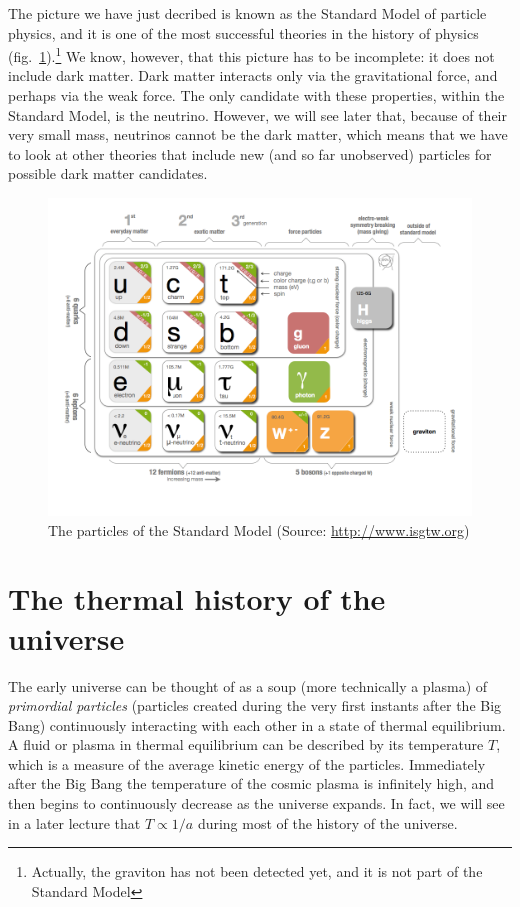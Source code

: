 The picture we have just decribed is known as the Standard Model of particle physics, and it is one of the most successful theories in the history of physics (fig.\ \ref{fig:lec6_5}).\footnote{Actually, the graviton has not been detected yet, and it is not part of the Standard Model} We know, however, that this picture has to be incomplete: it does not include dark matter. Dark matter interacts only via the gravitational force, and perhaps via the weak force. The only candidate with these properties, within the Standard Model, is the neutrino. However, we will see later that, because of their very small mass, neutrinos cannot be the dark matter, which means that we have to look at other theories that include new (and so far unobserved) particles for possible dark matter candidates.
\begin{figure}[ht]
\begin{center}
\includegraphics[scale=0.35]{Draw/lec6_5.png}
\end{center}
\caption{The particles of the Standard Model (Source: \url{http://www.isgtw.org})}
\label{fig:lec6_5}
\end{figure}

\section{The thermal history of the universe}
\label{chp7}

The early universe can be thought of as a soup (more technically a plasma) of {\it primordial particles} (particles created during the very first instants after the Big Bang) continuously interacting with each other in a state of thermal equilibrium. A fluid or plasma in thermal equilibrium can be described by its temperature $T$, which is a measure of the average kinetic energy of the particles. Immediately after the Big Bang the temperature of the cosmic plasma is infinitely high, and then begins to continuously decrease as the universe expands. In fact, we will see in a later lecture that $T\propto 1/a$ during most of the history of the universe.

